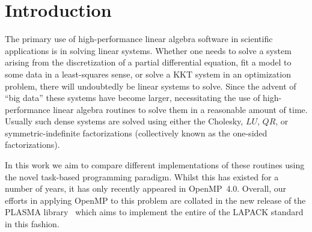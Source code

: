 \documentclass[a4paper,12pt]{article}
\begin{document}
%

\newpage

\renewcommand{\contentsname}{Table of Contents}
\tableofcontents

\listoffigures

\listoftables





\newpage

%

\section{Introduction}
\label{sec.introduction}
The primary use of high-performance linear algebra software
in scientific applications is in solving linear systems.
Whether one needs to solve a system arising from the discretization of
a partial differential equation,
fit a model to some data in a least-squares sense,
or solve a KKT system in an optimization problem,
there will undoubtedly be linear systems to solve.
Since the advent of ``big data'' these systems have become larger,
necessitating the use of high-performance linear algebra routines
to solve them in a reasonable amount of time.
Usually such dense systems are solved using either
the Cholesky, $LU$, $QR$, or symmetric-indefinite factorizations
(collectively known as the one-sided factorizations).

In this work we aim to compare different implementations of
these routines using the novel task-based programming paradigm.
Whilst this has existed for a number of years,
it has only recently appeared in OpenMP~4.0.
Overall,
our efforts in applying OpenMP to this problem
are collated in the new release of the PLASMA library~\cite{addh09}
which aims to implement the entire of the LAPACK standard~\cite{lug99}
in this fashion.
\end{document}
